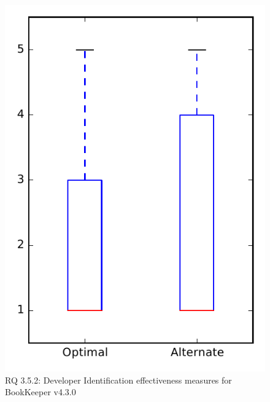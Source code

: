
\begin{figure}
\centering
\includegraphics[height=0.4\textheight]{figures/combo/dit_rq2_bookkeeper}
\caption{RQ 3.5.2: Developer Identification effectiveness measures for BookKeeper v4.3.0}
\label{fig:dit:rq2:bookkeeper}
\end{figure}
